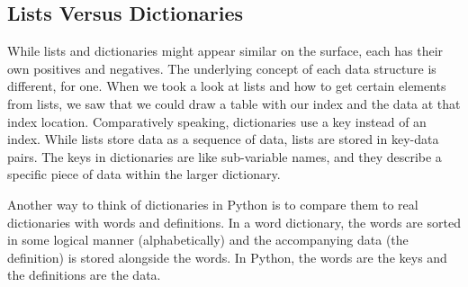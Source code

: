 \subsection{Lists Versus Dictionaries}
While lists and dictionaries might appear similar on the surface, each has their own positives and negatives. The underlying concept of each data structure is different, for one. When we took a look at lists and how to get certain elements from lists, we saw that we could draw a table with our index and the data at that index location. Comparatively speaking, dictionaries use a key instead of an index. While lists store data as a sequence of data, lists are stored in key-data pairs. The keys in dictionaries are like sub-variable names, and they describe a specific piece of data within the larger dictionary.\par
Another way to think of dictionaries in Python is to compare them to real dictionaries with words and definitions. In a word dictionary, the words are sorted in some logical manner (alphabetically) and the accompanying data (the definition) is stored alongside the words. In Python, the words are the keys and the definitions are the data.\par
